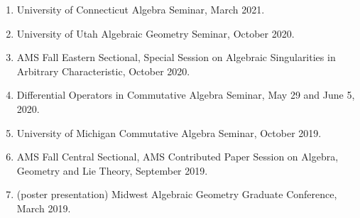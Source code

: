 \documentclass{res}
\begin{document}
\begin{resume}
\begin{enumerate}
University of Minnesota Commutative Algebra and Algebraic Geometry Seminar, April 2022.
\item 
University of Connecticut Algebra Seminar, March 2021.
\item 
University of Utah Algebraic Geometry Seminar, October 2020.
\item 
AMS Fall Eastern Sectional, Special Session on Algebraic Singularities in Arbitrary Characteristic, October 2020.
\item 
Differential Operators in Commutative Algebra Seminar, May 29 and June 5, 2020.
\item 
University of Michigan Commutative Algebra Seminar, October 2019.
\item 
AMS Fall Central Sectional, AMS Contributed Paper Session on Algebra, Geometry and Lie Theory, September 2019.
\item (poster presentation) 
Midwest Algebraic Geometry Graduate Conference, March 2019.
\end{enumerate}




\end{resume}
\end{document}
